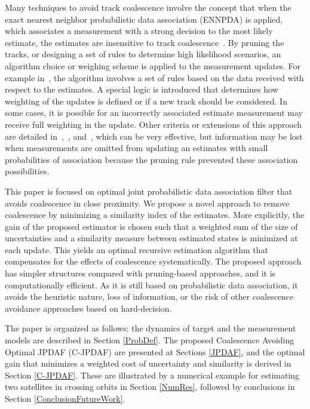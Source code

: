 \documentclass[letterpaper, 10pt, conference]{ieeeconf}
\begin{document}
Many techniques to avoid track coalescence involve the concept that when the exact nearest neighbor probabilistic data association (ENNPDA) is applied, which associates a measurement with a strong decision to the most likely estimate, the estimates are insensitive to track coalescence~\cite{Coal1}. By pruning the tracks, or designing a set of rules to determine high likelihood scenarios, an algorithm choice or weighing scheme is applied to the measurement updates.
For example in~\cite{Fitzgerald}, the algorithm involves a set of rules based on the data received with respect to the estimates. A special logic is introduced that determines how weighting of the updates is defined or if a new track should be considered. In some cases, it is possible for an incorrectly associated estimate measurement may receive full weighting in the update. Other criteria or extensions of this approach are detailed in~\cite{Coal_d},~\cite{Coal_e}, and~\cite{Coal_c}, which can be very effective, but information may be lost when measurements are omitted from updating an estimates with small probabilities of association because the pruning rule prevented these association possibilities.

This paper is focused on optimal joint probabilistic data association filter that avoids coalescence in close proximity. We propose a novel approach to remove coalescence by minimizing a similarity index of the estimates. More explicitly, the gain of the proposed estimator is chosen such that a weighted sum of the size of uncertainties and a similarity measure between estimated states is minimized at each update. This yields an optimal recursive estimation algorithm that compensates for the effects of coalescence systematically. The proposed approach has simpler structures compared with pruning-based approaches, and it is computationally efficient. As it is still based on probabilistic data association, it avoids the heuristic nature, loss of information, or the risk of other coalescence avoidance approaches based on hard-decision.

The paper is organized as follows: the dynamics of target and the measurement models are described in Section \ref{ProbDef}. The proposed Coalescence Avoiding Optimal JPDAF (C-JPDAF) are presented at Sections \ref{JPDAF}, and the optimal gain that minimizes a weighted cost of uncertainty and similarity is derived in Section \ref{C-JPDAF}.
These are illustrated by a numerical example for estimating two satellites in crossing orbits in Section \ref{NumRes}, followed by conclusions in Section \ref{ConclusionFutureWork}.
\end{document}
